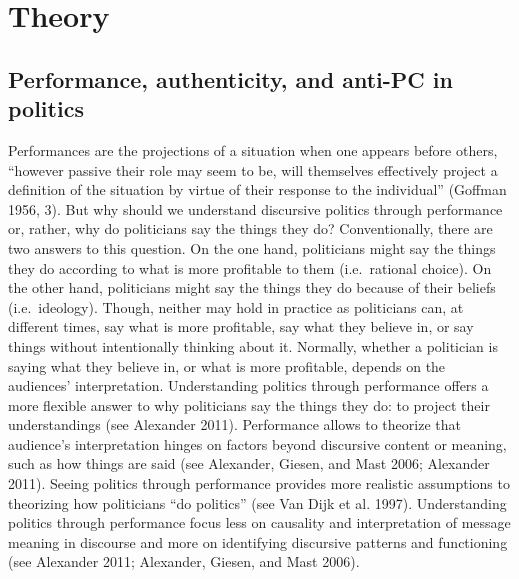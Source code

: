 \documentclass[smallextended]{svjour3}       %
\begin{document}
\hypertarget{theory}{%
\section{Theory}\label{theory}}

\hypertarget{performance-authenticity-and-anti-pc-in-politics}{%
\subsection{Performance, authenticity, and anti-PC in
politics}\label{performance-authenticity-and-anti-pc-in-politics}}

Performances are the projections of a situation when one appears before
others, ``however passive their role may seem to be, will themselves
effectively project a definition of the situation by virtue of their
response to the individual'' (Goffman 1956, 3). But why should we
understand discursive politics through performance or, rather, why do
politicians say the things they do? Conventionally, there are two
answers to this question. On the one hand, politicians might say the
things they do according to what is more profitable to them
(i.e.~rational choice). On the other hand, politicians might say the
things they do because of their beliefs (i.e.~ideology). Though, neither
may hold in practice as politicians can, at different times, say what is
more profitable, say what they believe in, or say things without
intentionally thinking about it. Normally, whether a politician is
saying what they believe in, or what is more profitable, depends on the
audiences' interpretation. Understanding politics through performance
offers a more flexible answer to why politicians say the things they do:
to project their understandings (see Alexander 2011). Performance allows
to theorize that audience's interpretation hinges on factors beyond
discursive content or meaning, such as how things are said (see
Alexander, Giesen, and Mast 2006; Alexander 2011). Seeing politics
through performance provides more realistic assumptions to theorizing
how politicians ``do politics'' (see Van Dijk et al. 1997).
Understanding politics through performance focus less on causality and
interpretation of message meaning in discourse and more on identifying
discursive patterns and functioning (see Alexander 2011; Alexander,
Giesen, and Mast 2006).
\end{document}
